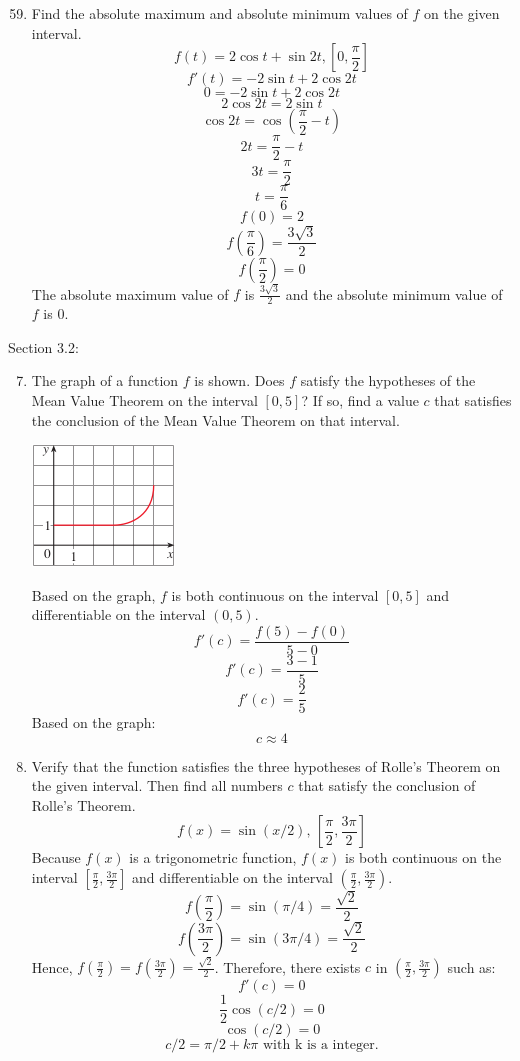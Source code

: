 \documentclass[12pt]{article}
\begin{document}
\begin{enumerate}
    \setcounter{enumi}{58}
    \item Find the absolute maximum and absolute minimum values of $f$ on the given interval.
        \[f(t) = 2\cos t + \sin 2t, [0,\frac{\pi}{2}]\]
        \[f'(t) = -2\sin t + 2\cos 2t\]
        \[0 = -2\sin t + 2\cos 2t\]
        \[2\cos 2t = 2\sin t\]
        \[\cos 2t = \cos (\frac{\pi}{2} - t)\]
        \[2t = \frac{\pi}{2} - t\]
        \[3t = \frac{\pi}{2}\]
        \[t = \frac{\pi}{6}\]
        \[f(0) = 2\]
        \[f(\frac{\pi}{6}) = \frac{3\sqrt{3}}{2}\]
        \[f(\frac{\pi}{2}) = 0\]
        The absolute maximum value of $f$ is ${\displaystyle \frac{3\sqrt{3}}{2}}$ and the absolute minimum value of $f$ is 0.
\end{enumerate}

\newpage
Section 3.2:
\begin{enumerate}
    \setcounter{enumi}{6}
    \item The graph of a function $f$ is shown. Does $f$ satisfy the hypotheses of the Mean Value Theorem on the interval $[0,5]$? If so, find a value $c$ that satisfies the conclusion of the Mean Value Theorem on that interval.
        \begin{center}
            \includegraphics{img/img-0.png}    
        \end{center}    
    Based on the graph, $f$ is both continuous on the interval $[0,5]$ and differentiable on the interval $(0,5)$.
        \[f'(c) = \frac{f(5) - f(0)}{5-0}\]
        \[f'(c) = \frac{3 - 1}{5}\]
        \[f'(c) = \frac{2}{5}\]
    Based on the graph:
        \[c \approx 4\]
    \setcounter{enumi}{10}
    \item Verify that the function satisfies the three hypotheses of Rolle’s Theorem on the given interval. Then find all numbers $c$ that satisfy the conclusion of Rolle’s Theorem.
        \[f(x) = \sin (x/2) \text{, }[\frac{\pi}{2},\frac{3\pi}{2}]\]
    Because $f(x)$ is a trigonometric function, $f(x)$ is both continuous on the interval $[\frac{\pi}{2},\frac{3\pi}{2}]$ and differentiable on the interval $(\frac{\pi}{2},\frac{3\pi}{2})$.
        \[f(\frac{\pi}{2}) = \sin (\pi/4) = \frac{\sqrt{2}}{2}\]
        \[f(\frac{3\pi}{2}) = \sin (3\pi/4) = \frac{\sqrt{2}}{2}\]
    Hence, $f(\frac{\pi}{2}) = f(\frac{3\pi}{2}) = \frac{\sqrt{2}}{2}$. Therefore, there exists $c$ in $(\frac{\pi}{2},\frac{3\pi}{2})$ such as:
        \[f'(c) = 0\]
        \[\frac{1}{2} \cos(c/2) = 0\]
        \[\cos(c/2) = 0\]
        \[c/2 = \pi/2 + k\pi \text{ with k is a integer.}\]
\end{enumerate}
\end{document}
